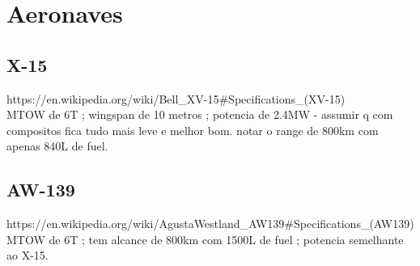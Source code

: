 \section{Aeronaves}

\subsection{X-15}
https://en.wikipedia.org/wiki/Bell\_XV-15#Specifications\_(XV-15)\\
MTOW de 6T ; wingspan de 10 metros ; potencia de 2.4MW - assumir q com compositos fica tudo mais leve e melhor bom. notar o range de 800km com apenas 840L de fuel.

\subsection{AW-139}
https://en.wikipedia.org/wiki/AgustaWestland\_AW139#Specifications\_(AW139)\\
MTOW de 6T ; tem alcance de 800km com 1500L de fuel ; potencia semelhante ao X-15.

